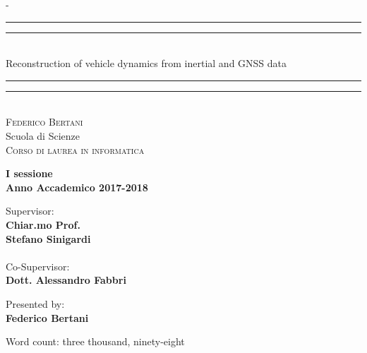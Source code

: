 \begin{titlingpage}
\begin{SingleSpace}
\calccentering{\unitlength} 
\begin{adjustwidth*}{\unitlength}{-\unitlength}
\vspace*{13mm}
\begin{center}
\rule[0.5ex]{\linewidth}{2pt}\vspace*{-\baselineskip}\vspace*{3.2pt}
\rule[0.5ex]{\linewidth}{1pt}\\[\baselineskip]
{\HUGE Reconstruction of vehicle dynamics from inertial and GNSS data }\\[4mm]
\rule[0.5ex]{\linewidth}{1pt}\vspace*{-\baselineskip}\vspace{3.2pt}
\rule[0.5ex]{\linewidth}{2pt}\\
\vspace{13mm}
{\large\textsc{Federico Bertani}}\\
\vspace{11mm}
{\large Scuola di Scienze\\
\textsc{Corso di laurea in informatica}}\\
\vspace{10mm}
\begin{center}
{\large{\bf I sessione\\
Anno Accademico 2017-2018 }}
\end{center}
\vfill
\noindent
\begin{minipage}[t]{0.47\textwidth}
{\large Supervisor:\\
\textbf{Chiar.mo Prof.\\
Stefano Sinigardi}\\
\\
Co-Supervisor:\\
\textbf{Dott. Alessandro Fabbri}}
\end{minipage}
\hfill
\begin{minipage}[t]{0.47\textwidth}\raggedleft
{\large Presented by:\\
\textbf{Federico Bertani}}
\end{minipage}
\vspace{20mm}
\end{center}
\end{adjustwidth*}
\end{SingleSpace}
\vspace{11mm}
\begin{flushright}
{\small Word count: three thousand, ninety-eight}
\end{flushright}
\end{titlingpage}
